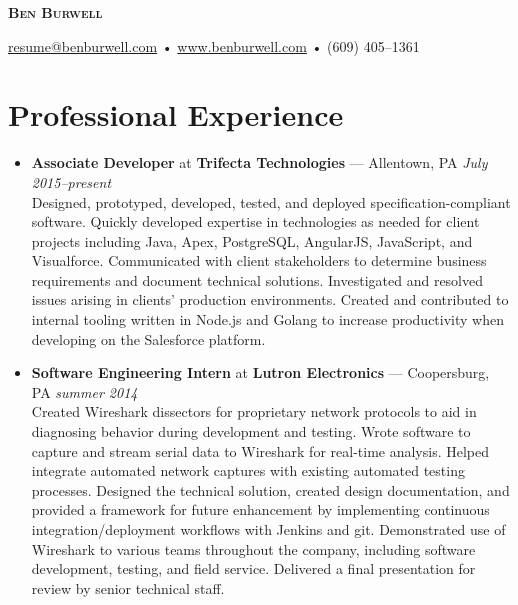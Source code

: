 \documentclass[11pt]{article}
\begin{document}
\thispagestyle{empty}

\begin{center}
  {\LARGE\textsc{\textbf{Ben Burwell}}}
\end{center}
\begin{center}
  \href{mailto:resume@benburwell.com}{resume@benburwell.com} • \href{https://www.benburwell.com/}{www.benburwell.com} • (609) 405--1361 \\
  \hrulefill
\end{center}



\section*{Professional Experience}
\begin{itemize}
  \item \textbf{Associate Developer} at \textbf{Trifecta Technologies} --- Allentown, PA \hfill {\em July 2015--present} \\
    Designed, prototyped, developed, tested, and deployed specification-compliant software.
    Quickly developed expertise in technologies as needed for client projects including Java, Apex, PostgreSQL, AngularJS, JavaScript, and Visualforce.
    Communicated with client stakeholders to determine business requirements and document technical solutions.
    Investigated and resolved issues arising in clients' production environments.
    Created and contributed to internal tooling written in Node.js and Golang to increase productivity when developing on the Salesforce platform.

  \item \textbf{Software Engineering Intern} at \textbf{Lutron Electronics} --- Coopersburg, PA \hfill {\em summer 2014} \\
    Created Wireshark dissectors for proprietary network protocols to aid in diagnosing behavior during development and testing.
    Wrote software to capture and stream serial data to Wireshark for real-time analysis.
    Helped integrate automated network captures with existing automated testing processes.
    Designed the technical solution, created design documentation, and provided a framework for future enhancement by implementing continuous integration/deployment workflows with Jenkins and git.
    Demonstrated use of Wireshark to various teams throughout the company, including software development, testing, and field service.
    Delivered a final presentation for review by senior technical staff.
\end{itemize}
\end{document}
